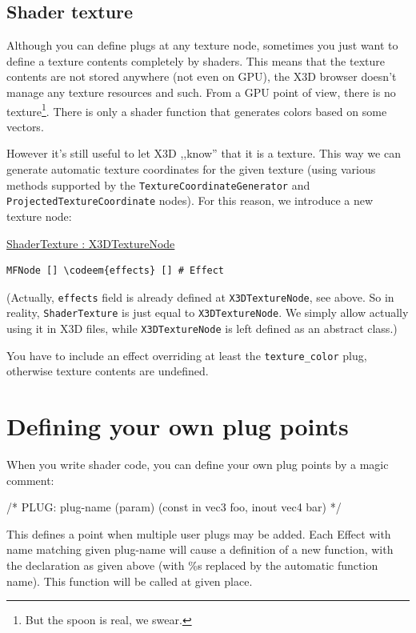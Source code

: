 \documentclass{acmsiggraph}                     %
\newenvironment{mycode}
{\begin{mycodecore}}
{\end{mycodecore}
\vspace{-0.1in}}
\newcommand*{\codeem}[1]{\textbf{#1}}
\begin{document}
\subsection{Shader texture}

Although you can define plugs at any texture node, sometimes you just
want to define a texture contents completely by shaders. This means
that the texture contents are not stored anywhere (not even on GPU),
the X3D browser doesn't manage any texture resources and such.
From a GPU point of view, there is no texture\footnote{But the spoon is real,
we swear.}. There is only a shader function that generates colors
based on some vectors.

However it's still useful to let X3D ,,know'' that it is a texture.
This way we can generate automatic texture coordinates for the given
texture (using various methods supported by the
\texttt{TextureCoordinateGenerator} and \texttt{ProjectedTextureCoordinate}
nodes). For this reason, we introduce a new texture node:

\begin{mycode}
\underline{ShaderTexture : X3DTextureNode}
\begin{Verbatim}[commandchars=\\\{\}]
MFNode [] \codeem{effects} [] # Effect
\end{Verbatim}
\end{mycode}

(Actually, \texttt{effects} field is already defined at \texttt{X3DTextureNode},
see above. So in reality, \texttt{ShaderTexture} is just equal to
\texttt{X3DTextureNode}. We simply allow actually using it in X3D files,
while \texttt{X3DTextureNode} is left defined as an abstract class.)

You have to include an effect overriding at least the \texttt{texture\_color}
plug, otherwise texture contents are undefined.

\section{Defining your own plug points}

When you write shader code, you can define your own plug points by a
magic comment:

\begin{mycode}
/* PLUG: plug-name (param) (const in vec3 foo, inout vec4 bar) */
\end{mycode}

This defines a point when multiple user plugs may be added. Each
Effect with name matching given plug-name will cause a
definition of a new function, with the declaration as given above
(with \%s replaced by the automatic function name). This function will
be called at given place.
\end{document}

